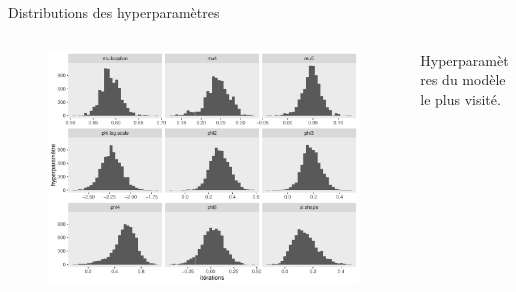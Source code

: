 \documentclass[aspectratio=169]{beamer}
\begin{document}
\begin{frame}{Distributions des hyperparamètres}
\begin{columns}
	\begin{column}{0.7\textwidth}
		\begin{figure}
		\vspace{-0.4cm}
	 		\includegraphics[height=0.85\textheight, center]{../figures/hists.pdf}
		\end{figure}
	\end{column}
	\begin{column}{0.3\textwidth}
	Hyperparamètres du modèle le plus visité.
	\end{column}
\end{columns}
\end{frame}
\end{document}
